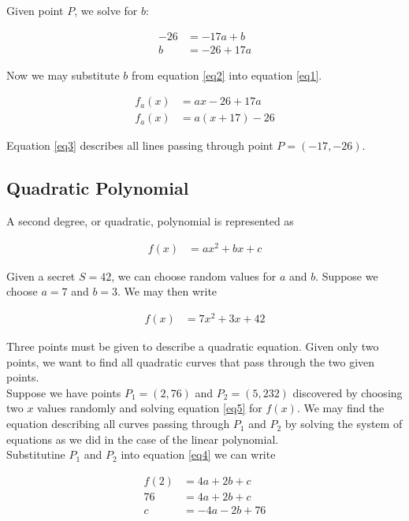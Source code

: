 \documentclass[preview,border=3mm]{article}
\begin{document}
\noindent
Given point $P$, we solve for $b$:


\begin{align}
    -26 &= -17a + b  \nonumber\\
    b   &= -26 + 17a \label{eq2}
\end{align}

\noindent
Now we may substitute $b$ from equation \ref{eq2} into equation \ref{eq1}.


\begin{align}
    f_a(x) &= ax -26 + 17a \nonumber \\
    f_a(x) &= a(x + 17) - 26 \label{eq3}
\end{align}

\noindent
Equation \ref{eq3} describes all lines passing through point $P = (-17, -26)$.\\


\subsection{Quadratic Polynomial}

\noindent
A second degree, or quadratic, polynomial is represented as

\begin{align}
    f(x) &= ax^2 + bx + c \label{eq4}
\end{align}

\noindent
Given a secret $S = 42$, we can choose random values for $a$ and $b$. Suppose
we choose $a = 7$ and $b = 3$. We may then write

\begin{align}
    f(x) &= 7x^2 + 3x + 42 \label{eq5}
\end{align}

\noindent
Three points must be given to describe a quadratic equation. Given only two
points, we want to find all quadratic curves that pass through the two given
points.\\

\noindent
Suppose we have points $P_1 = (2, 76)$ and $P_2 = (5, 232)$ discovered by choosing
two $x$ values randomly and solving equation \ref{eq5} for $f(x)$. We may find
the equation describing all curves passing through $P_1$ and $P_2$ by solving
the system of equations as we did in the case of the linear polynomial.\\

\noindent
Substitutine $P_1$ and $P_2$ into equation \ref{eq4} we can write

\begin{align}
    f(2) &= 4a + 2b + c \nonumber \\
    76   &= 4a + 2b + c \nonumber \\
    c    &= -4a - 2b + 76 \label{eq6}
\end{align}
\end{document}
